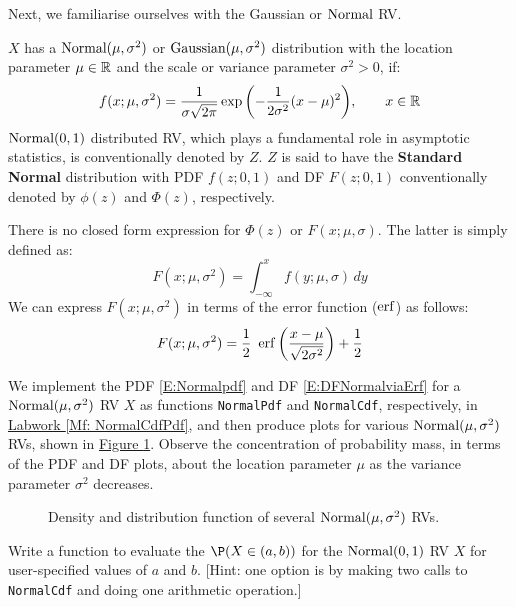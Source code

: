 Next, we familiarise ourselves with the Gaussian or $\mbox{{\rm Normal}}$ RV.
\begin{model}
$X$ has a $\mbox{{\rm Normal}}(\mu,\sigma^2)$ or $\mbox{{\rm Gaussian}}(\mu,\sigma^2)$ distribution with the location parameter $\mu \in \mathbb{R}$ and the scale or variance parameter $\sigma^2 > 0$, if:
\begin{equation}\label{E:Normalpdf}
f(x; \mu, \sigma^2) = \frac{1}{\sigma \sqrt{2 \pi}}
 \exp{\left( - \frac{1}{2 \sigma^2} (x-\mu)^2 \right)}, \qquad x \in \mathbb{R}
\end{equation}
$\mbox{{\rm Normal}}(0,1)$ distributed RV, which plays a fundamental role in asymptotic statistics, is conventionally denoted by $Z$.  $Z$ is said to have the {\bf Standard Normal} distribution with PDF $f(z; 0,1)$ and DF $F(z;0,1)$ conventionally denoted by $\phi(z)$ and $\Phi(z)$, respectively.

There is no closed form expression for $\Phi(z)$ or $F(x;\mu,\sigma)$.  The latter is simply defined as:
\[
F(x;\mu,\sigma^2) = \int_{-\infty}^x f(y;\mu,\sigma)\,dy
\]
We can express $F(x;\mu,\sigma^2)$ in terms of the error function ($\operatorname{erf}$) as follows:
\begin{equation}\label{E:DFNormalviaErf}
F(x;\mu,\sigma^2) = \frac{1}{2} \ \operatorname{erf} \left(  \frac{x-\mu}{\sqrt{2 \sigma^2}} \right)+ \frac{1}{2}
\end{equation}
\end{model}
We 
implement the PDF \eqref{E:Normalpdf} and DF \eqref{E:DFNormalviaErf} for a $\mbox{{\rm Normal}}(\mu,\sigma^2)$ RV $X$ as \Matlab functions {\tt NormalPdf} and {\tt NormalCdf}, respectively, in \hyperref[Mf: NormalCdfPdf]{Labwork \ref*{Mf: NormalCdfPdf}},  and then 
produce plots for various $\mbox{{\rm Normal}}(\mu,\sigma^2)$ RVs, shown in \hyperref[F:plotPdfCdfNormals]{Figure \ref*{F:plotPdfCdfNormals}}.  Observe the concentration of probability mass, in terms of the PDF and DF plots, about the location parameter $\mu$ as the variance parameter $\sigma^2$ decreases.
\begin{figure}[htpb]
\caption{Density and distribution function of several $\mbox{{\rm Normal}}(\mu,\sigma^2)$ RVs.\label{F:plotPdfCdfNormals}}
\centering   {}
\end{figure}

\begin{labwork}\label{LW:NormalIntervalProb}
Write a function to evaluate the $\P(X \in (a,b))$ for the $\mbox{{\rm Normal}}(0,1)$ RV $X$ for user-specified values of $a$ and $b$. [Hint: one option is by making two calls to {\tt NormalCdf} and doing one arithmetic operation.]
\end{labwork}

